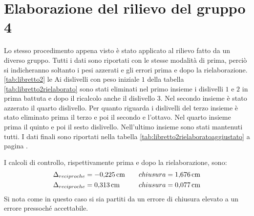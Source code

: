 \section{Elaborazione del rilievo del gruppo 4}
Lo stesso procedimento appena visto è stato applicato al rilievo fatto da un diverso gruppo. 
Tutti i dati sono riportati con le stesse modalità di prima, perciò si indicheranno soltanto i pesi azzerati e gli errori prima e dopo la rielaborazione.
\ref{tab:libretto2} le 
Ai dislivelli con peso iniziale $1$ della tabella \ref{tab:libretto2rielaborato} sono stati eliminati nel primo insieme i dislivelli $1$ e $2$ in prima battuta e dopo il ricalcolo anche il dislivello $3$. 
Nel secondo insieme è stato azzerato il quarto dislivello.
Per quanto riguarda i dislivelli del terzo insieme è stato eliminato prima il terzo e poi il secondo e l'ottavo.
Nel quarto insieme prima il quinto e poi il sesto dislivello.
Nell'ultimo insieme sono stati mantenuti tutti. 
I dati finali sono riportati nella tabella \ref{tab:libretto2rielaboratoaggiustato} a pagina \pageref{tab:libretto2rielaboratoaggiustato}. 

I calcoli di controllo, rispettivamente prima e dopo la rielaborazione, sono: 
\begin{align*}
\Delta_{reciproche} &= \SI{-0.225}{\centi\metre} \quad & chiusura = \SI{1.676}{\centi\metre} \\
\Delta_{reciproche} &= \SI{0.313}{\centi\metre} \quad & chiusura = \SI{0.077}{\centi\metre}
\end{align*}
Si nota come in questo caso si sia partiti da un errore di chiusura elevato a un errore pressoché accettabile.




